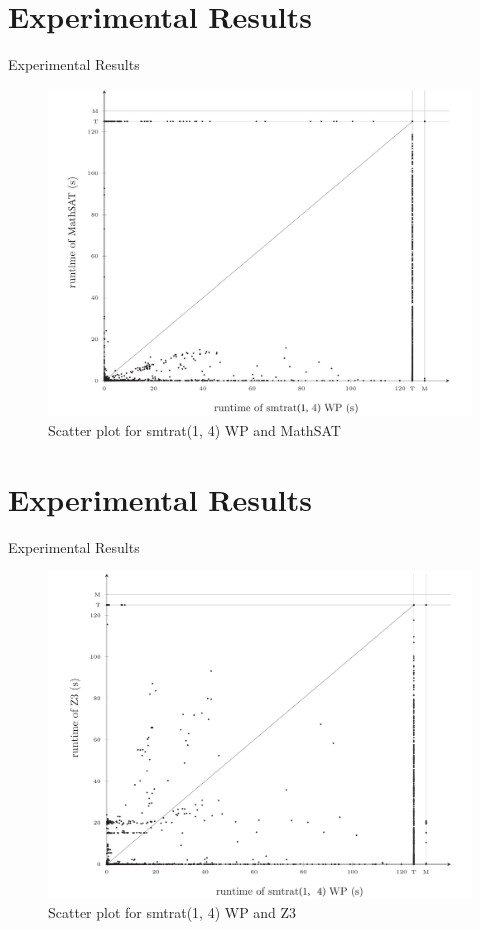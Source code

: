 \documentclass[]{beamer}
\begin{document}
\section{Experimental Results}
\begin{frame}{Experimental Results}
\begin{figure}[!ht]
    \centering
    \caption{Scatter plot for smtrat(1, 4) WP and MathSAT}
    \includegraphics[width=.75\linewidth]{../figures/scatter-smtrat_4_preprocessing-mathsat-slide.pdf}
\end{figure}
\end{frame}

\section{Experimental Results}
\begin{frame}{Experimental Results}
\begin{figure}[!ht]
    \centering
    \caption{Scatter plot for smtrat(1, 4) WP and Z3}
    \includegraphics[width=.75\linewidth]{../figures/scatter-smtrat_4_preprocessing-z3-slide.pdf}
\end{figure}
\end{frame}
\end{document}
